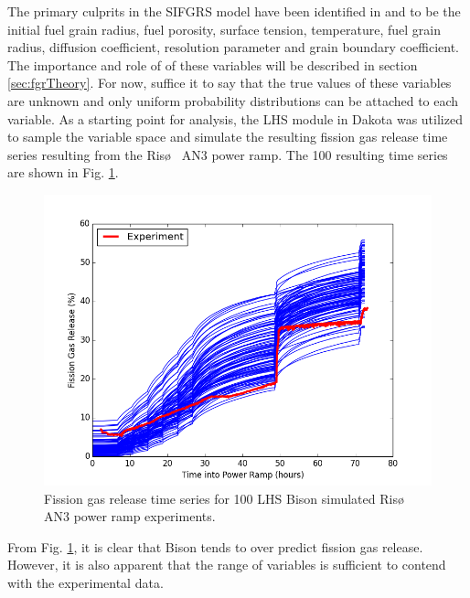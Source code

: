 The primary culprits in the \ac{SIFGRS} model have been identified in \cite{Swiler3} and \cite{Pastore} to be the initial fuel grain radius, fuel porosity, surface tension, temperature, fuel grain radius, diffusion coefficient, resolution parameter and grain boundary coefficient. The importance and role of of these variables will be described in section \ref{sec:fgrTheory}. For now, suffice it to say that the true values of these variables are unknown and only uniform probability distributions can be attached to each variable. As a starting point for analysis, the \ac{LHS} module in Dakota was utilized to sample the variable space and simulate the resulting fission gas release time series resulting from the Ris\o~ AN3 power ramp. The 100 resulting time series are shown in Fig. \ref{fig:fgrSimulations}.
\begin{figure}
\caption{\label{fig:fgrSimulations}
Fission gas release time series for 100 \ac{LHS} Bison simulated Ris\o~ AN3 power ramp experiments.}
 \begin{center}
  \includegraphics[scale=.75]{./Chapter4/fgr_simulations.png}
 \end{center}
\end{figure}
From Fig. \ref{fig:fgrSimulations}, it is clear that Bison tends to over predict fission gas release. However, it is also apparent that the range of variables is sufficient to contend with the experimental data.
